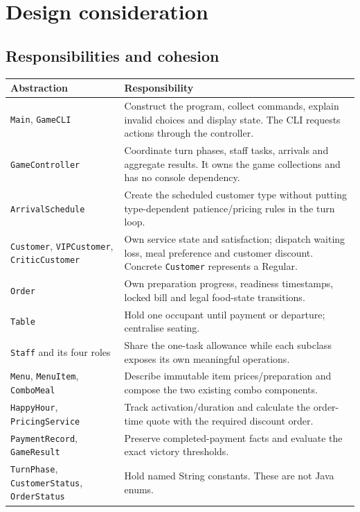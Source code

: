 \section{Design consideration}
\subsection{Responsibilities and cohesion}
\begin{longtable}{@{}p{}p{}@{}}
\toprule \textbf{Abstraction} & \textbf{Responsibility}\\\midrule\endhead
\texttt{Main}, \texttt{GameCLI} & Construct the program, collect commands, explain invalid choices and display state. The CLI requests actions through the controller.\\
\texttt{GameController} & Coordinate turn phases, staff tasks, arrivals and aggregate results. It owns the game collections and has no console dependency.\\
\texttt{ArrivalSchedule} & Create the scheduled customer type without putting type-dependent patience/pricing rules in the turn loop.\\
\texttt{Customer}, \texttt{VIPCustomer}, \texttt{CriticCustomer} & Own service state and satisfaction; dispatch waiting loss, meal preference and customer discount. Concrete \texttt{Customer} represents a Regular.\\
\texttt{Order} & Own preparation progress, readiness timestamps, locked bill and legal food-state transitions.\\
\texttt{Table} & Hold one occupant until payment or departure; centralise seating.\\
\texttt{Staff} and its four roles & Share the one-task allowance while each subclass exposes its own meaningful operations.\\
\texttt{Menu}, \texttt{MenuItem}, \texttt{ComboMeal} & Describe immutable item prices/preparation and compose the two existing combo components.\\
\texttt{HappyHour}, \texttt{PricingService} & Track activation/duration and calculate the order-time quote with the required discount order.\\
\texttt{PaymentRecord}, \texttt{GameResult} & Preserve completed-payment facts and evaluate the exact victory thresholds.\\
\texttt{TurnPhase}, \texttt{CustomerStatus}, \texttt{OrderStatus} & Hold named String constants. These are not Java enums.\\
\bottomrule
\end{longtable}

